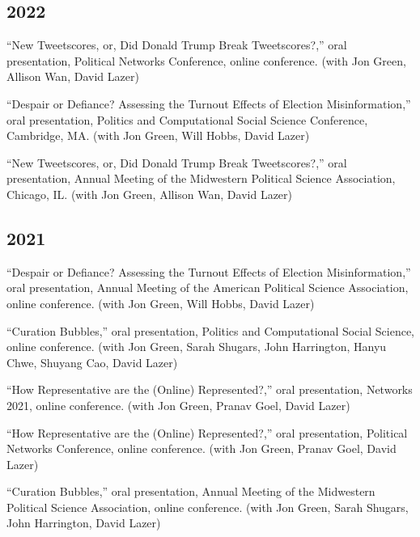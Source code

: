 \documentclass[11pt, letter]{article}
\begin{document}
\subsection{2022}
\begin{hangparas}{.25in}{1}
``New Tweetscores, or, Did Donald Trump Break Tweetscores?,'' oral
presentation, Political Networks Conference, online
conference. (with Jon Green, Allison Wan, David Lazer) \vspace{2mm}

``Despair or Defiance? Assessing the Turnout Effects of Election
Misinformation,'' oral presentation, Politics and Computational Social
Science Conference, Cambridge, MA. (with Jon Green, Will Hobbs, David
Lazer) \vspace{2mm}

``New Tweetscores, or, Did Donald Trump Break Tweetscores?,'' oral
presentation, Annual Meeting of the Midwestern Political Science Association,
Chicago, IL. (with Jon Green, Allison Wan, David Lazer) \vspace{2mm}
\end{hangparas}

\subsection{2021}
\begin{hangparas}{.25in}{1}
``Despair or Defiance? Assessing the Turnout Effects of Election
Misinformation,'' oral presentation, Annual Meeting of the American Political
Science Association, online conference. (with Jon Green, Will Hobbs, David
Lazer) \vspace{2mm}

``Curation Bubbles,'' oral presentation, Politics and Computational Social
Science, online conference. (with Jon Green, Sarah Shugars, John Harrington,
Hanyu Chwe, Shuyang Cao, David Lazer) \vspace{2mm}

``How Representative are the (Online) Represented?,'' oral presentation,
Networks 2021, online conference. (with Jon Green, Pranav
Goel, David Lazer) \vspace{2mm}

``How Representative are the (Online) Represented?,'' oral presentation,
Political Networks Conference, online conference. (with Jon Green, Pranav
Goel, David Lazer) \vspace{2mm}

``Curation Bubbles,'' oral presentation, Annual Meeting of the Midwestern
Political Science Association, online conference. (with Jon Green, Sarah
Shugars, John Harrington, David Lazer) \vspace{2mm}
\end{hangparas}
\end{document}
